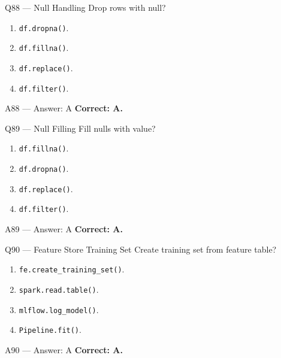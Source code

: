 \documentclass[aspectratio=169,9pt]{beamer}
\begin{document}
	\begin{frame}{Q88 — Null Handling}
		Drop rows with null?
		\begin{enumerate}[label=\Alph*.]
			\item \texttt{df.dropna()}.
			\item \texttt{df.fillna()}.
			\item \texttt{df.replace()}.
			\item \texttt{df.filter()}.
		\end{enumerate}
	\end{frame}
	
	\begin{frame}{A88 — Answer: A}
		\textbf{Correct: A.}
	\end{frame}
	
	\begin{frame}{Q89 — Null Filling}
		Fill nulls with value?
		\begin{enumerate}[label=\Alph*.]
			\item \texttt{df.fillna()}.
			\item \texttt{df.dropna()}.
			\item \texttt{df.replace()}.
			\item \texttt{df.filter()}.
		\end{enumerate}
	\end{frame}
	
	\begin{frame}{A89 — Answer: A}
		\textbf{Correct: A.}
	\end{frame}
	
	\begin{frame}{Q90 — Feature Store Training Set}
		Create training set from feature table?
		\begin{enumerate}[label=\Alph*.]
			\item \texttt{fe.create\_training\_set()}.
			\item \texttt{spark.read.table()}.
			\item \texttt{mlflow.log\_model()}.
			\item \texttt{Pipeline.fit()}.
		\end{enumerate}
	\end{frame}
	
	\begin{frame}{A90 — Answer: A}
		\textbf{Correct: A.}
	\end{frame}
	
	
\end{document}
